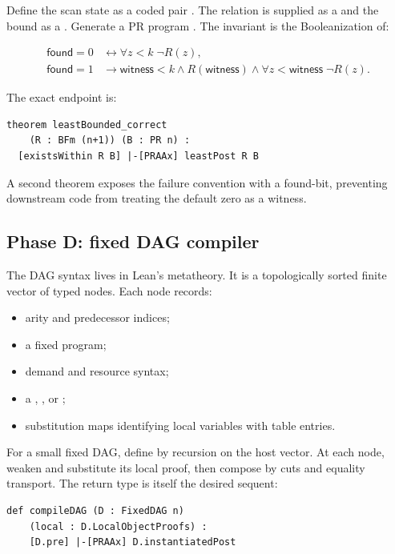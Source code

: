 Define the scan state as a coded pair .  The relation is supplied as a  and the bound as a .  Generate a PR program .  The invariant is the Booleanization of:

\begin{align*}
 \mathsf{found}=0&\leftrightarrow
      \forall z<k\;\neg R(z),\\
 \mathsf{found}=1&\to
      \mathsf{witness}<k\wedge R(\mathsf{witness})
      \wedge\forall z<\mathsf{witness}\;\neg R(z).
\end{align*}

The exact endpoint is:

\begin{lstlisting}[language=Lean]
theorem leastBounded_correct
    (R : BFm (n+1)) (B : PR n) :
  [existsWithin R B] |-[PRAAx] leastPost R B
\end{lstlisting}

A second theorem exposes the failure convention with a found-bit, preventing downstream code from treating the default zero as a witness.

\subsection{Phase D: fixed DAG compiler}

The DAG syntax lives in Lean's metatheory.  It is a topologically sorted finite vector of typed nodes.  Each node records:

\begin{itemize}
  \item arity and predecessor indices;
  \item a fixed  program;
  \item demand and resource syntax;
  \item a , , or ;
  \item substitution maps identifying local variables with table entries.
\end{itemize}

For a small fixed DAG, define  by recursion on the host vector.  At each node, weaken and substitute its local proof, then compose by cuts and equality transport.  The return type is itself the desired sequent:

\begin{lstlisting}[language=Lean]
def compileDAG (D : FixedDAG n)
    (local : D.LocalObjectProofs) :
    [D.pre] |-[PRAAx] D.instantiatedPost
\end{lstlisting}

